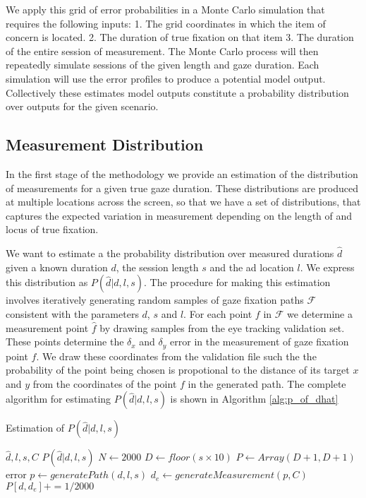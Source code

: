 \documentclass[12pt,a4paper]{article}
\numberwithin{equation}{section}
\begin{document}
We apply this grid of error probabilities in a Monte Carlo simulation that requires the following inputs:
1.	The grid coordinates in which the item of concern is located.
2.	The duration of true fixation on that item
3.	The duration of the entire session of measurement.
The Monte Carlo process will then repeatedly simulate sessions of the given length and gaze duration. Each simulation will use the error profiles to produce a potential model output. Collectively these estimates model outputs constitute a probability distribution over outputs for the given scenario.

\subsection{Measurement Distribution}

In the first stage of the methodology we provide an estimation of the distribution of 
measurements for a given true gaze duration. These distributions are produced at multiple locations
across the screen, so that we have a set of distributions, that captures the expected
variation in measurement depending on the length of and locus of true fixation.

We want to estimate a the probability distribution over measured durations $\hat{d}$ given a
known duration $d$, the session length $s$ and the ad location $l$. 
We express this distribution as $P(\hat{d}|d,l,s)$. The
procedure for making this estimation involves iteratively generating random samples
of gaze fixation paths $\mathcal{F}$ consistent with the parameters $d$, $s$ and $l$. 
For each point $f$ in $\mathcal{F}$ we determine a measurement point $\hat{f}$ 
by drawing samples from the eye tracking validation set. 
These points determine the $\delta_x$ and $\delta_y$ error in the measurement
of gaze fixation point $f$. We draw these coordinates from the validation file such the
the probability of the point being chosen is propotional to the distance of its target
$x$ and $y$ from the coordinates of the point $f$ in the generated path. The complete algorithm
for estimating $P(\hat{d}|d,l,s)$ is shown in Algorithm \ref{alg:p_of_dhat}    

\begin{algorithm}
\caption{Estimation of $P(\hat{d}|d,l,s)$}\label{alg:p_of_dhat}
\begin{algorithmic}
  \Require $\hat{d},l,s,C$
  \Ensure $P(\hat{d}|d,l,s)$
  \State $N \gets 2000$
  \State $D \gets floor(s \times 10)$ 
  \State $P \gets Array(D+1,D+1)$ 
    \State error
  \EndIf
   
     
      \State $p \gets generatePath(d,l,s)$
      \State $d_e \gets generateMeasurement(p,C)$  
      \State $P[d,d_e] += 1/2000$  
    \EndFor
  \EndFor
\end{algorithmic}
\end{algorithm}
\end{document}
